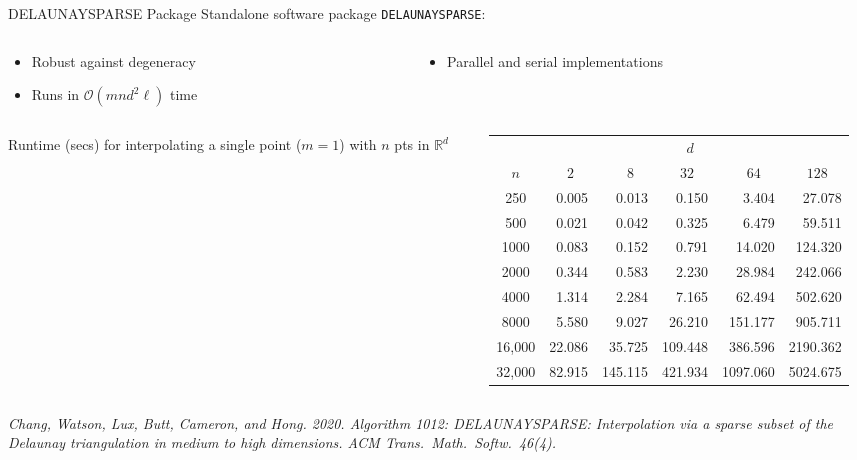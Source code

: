 \documentclass[aspectratio=169]{beamer}
\begin{document}
\begin{frame}{DELAUNAYSPARSE Package}
Standalone software package {\tt DELAUNAYSPARSE}:
\begin{columns}
\begin{column}{.5\textwidth}
\begin{itemize}
\item Robust against degeneracy
\item Runs in $\mathcal{O}(m n d^2 \ell)$ time
\end{itemize}
\end{column}
\begin{column}{.5\textwidth}
\begin{itemize}
\item Parallel and serial implementations
\end{itemize}
\end{column}
\end{columns}
\begin{columns}
\begin{column}{.15\textwidth}
Runtime (secs) for interpolating a single point ($m=1$) with $n$ pts
in $\mathbb{R}^d$
\end{column}
\begin{column}{.8\textwidth}
{\small
\begin{center}
\begin{tabular}{c|rrrrr}
& & & $d\quad$ & & \\
$n$ & $2\quad$ & $8\quad$ & $32\quad$ & $64\quad$ & $128\quad$ \\
\hline
250    & 0.005  & 0.013   & 0.150   & 3.404    & 27.078   \\
500    & 0.021  & 0.042   & 0.325   & 6.479    & 59.511   \\
1000   & 0.083  & 0.152   & 0.791   & 14.020   & 124.320  \\
2000   & 0.344  & 0.583   & 2.230   & 28.984   & 242.066  \\
4000   & 1.314  & 2.284   & 7.165   & 62.494   & 502.620  \\
8000   & 5.580  & 9.027   & 26.210  & 151.177  & 905.711  \\
16,000 & 22.086 & 35.725  & 109.448 & 386.596  & 2190.362 \\
32,000 & 82.915 & 145.115 & 421.934 & 1097.060 & 5024.675 \\
\end{tabular}
\end{center}
}
\end{column}
\end{columns}
\vfill
{\tiny \it Chang, Watson, Lux, Butt, Cameron, and Hong. 2020.
Algorithm 1012: DELAUNAYSPARSE: Interpolation via a sparse subset of the
Delaunay triangulation in medium to high dimensions.
ACM Trans.\ Math.\ Softw.\ 46(4).}
\end{frame}
\end{document}
